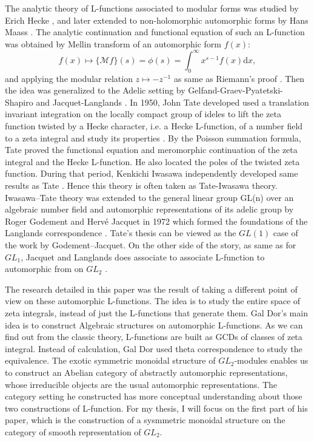 \documentclass[12pt,a4paper,english]{article}
\theoremstyle{plain}
\theoremstyle{definition}
\begin{document}
The analytic theory of L-functions associated to modular forms was studied by Erich Hecke \cite{hecke1936bestimmung}, and later extended to non-holomorphic automorphic forms by Hans Maass \cite{maass1949neue}. The analytic continuation and functional equation of such an L-function was obtained by Mellin transform of an automorphic form $f(x)$:
\begin{equation*}
    f(x)\mapsto \{\mathcal{M}f\}(s)=\phi(s)=\int^{\infty}_{0}x^{s-1}f(x)\text{d}x, 
\end{equation*}
and applying the modular relation $z\mapsto -z^{-1}$ as same as Riemann's proof \cite{riemann1859ueber}. Then the idea was generalized to the Adelic setting by Gelfand-Graev-Pyatetski-Shapiro \cite{gelfand1968representation} and Jacquet-Langlands \cite{langlands1970automorphic}. In 1950, John Tate
developed used a translation invariant integration on the locally compact group of ideles to lift the zeta function twisted by a Hecke character, i.e. a Hecke L-function, of a number field to a zeta integral and study its properties \cite{tate1997fourier}.  By the Poisson summation formula, Tate proved the functional equation and meromorphic continuation of the zeta integral and the Hecke L-function. He also located the poles of the twisted zeta function. During that period, Kenkichi Iwasawa independently developed same results as Tate \cite{iwasawa1992letter}. Hence this theory is often taken as Tate-Iwasawa theory. Iwasawa–Tate theory was extended to the general linear group GL(n) over an algebraic number field and automorphic representations of its adelic group by Roger Godement and Hervé Jacquet in 1972 which formed the foundations of the Langlands correspondence \cite{godement1974notes}. Tate's thesis can be viewed as the $GL(1)$ case of the work by Godement–Jacquet.
On the other side of the story, as same as for $GL_{1}$, Jacquet and Langlands does associate to associate L-function to automorphic from on $GL_{2}$ \cite{langlands1970automorphic}.

The research detailed in this paper was the result of taking a different point
of view on these automorphic L-functions. The idea is to study the entire space
of zeta integrals, instead of just the L-functions that generate them. Gal Dor's main idea is to construct Algebraic structures on automorphic L-functions. As we can find out from the classic theory, L-functions are built as GCDs of classes of zeta integral. Instead of calculation, Gal Dor used theta correspondence to study the equivalence.  The exotic symmetric monoidal
structure of $GL_{2}$-modules enables us to construct an Abelian category of abstractly
automorphic representations, whose irreducible objects are the usual automorphic representations. The category setting he constructed has more conceptual understanding about those two constructions of L-function. For my thesis, I will focus on the first part of his paper, which is the construction of a sysmmetric monoidal structure on the category of smooth representation of $GL_{2}$.
\end{document}
